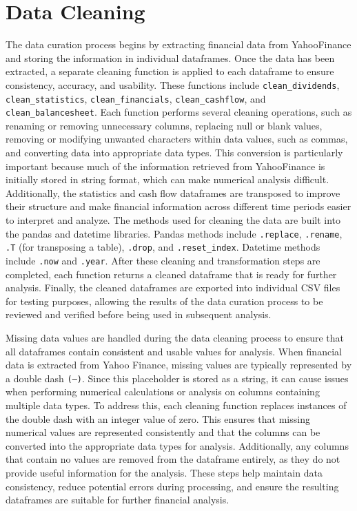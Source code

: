 \documentclass[runningheads]{llncs}
\begin{document}
\section{Data Cleaning}

The data curation process begins by extracting financial data from YahooFinance and storing the information in individual dataframes. Once the data has been extracted, a separate cleaning function is applied to each dataframe to ensure consistency, accuracy, and usability. These functions include \texttt{clean\_}\allowbreak\texttt{dividends}, \texttt{clean\_}\allowbreak\texttt{statistics}, \texttt{clean\_}\allowbreak\texttt{financials}, \texttt{clean\_}\allowbreak\texttt{cashflow}, and \texttt{clean\_}\allowbreak\texttt{balance}\allowbreak\texttt{sheet}. Each function performs several cleaning operations, such as renaming or removing unnecessary columns, replacing null or blank values, removing or modifying unwanted characters within data values, such as commas, and converting data into appropriate data types. This conversion is particularly important because much of the information retrieved from YahooFinance is initially stored in string format, which can make numerical analysis difficult. Additionally, the statistics and cash flow dataframes are transposed to improve their structure and make financial information across different time periods easier to interpret and analyze. The methods used for cleaning the data are built into the pandas and datetime libraries. Pandas methods include \texttt{.replace}, \texttt{.rename}, \texttt{.T} (for transposing a table), \texttt{.drop}, and \texttt{.reset\_index}. Datetime methods include \texttt{.now} and \texttt{.year}. After these cleaning and transformation steps are completed, each function returns a cleaned dataframe that is ready for further analysis. Finally, the cleaned dataframes are exported into individual CSV files for testing purposes, allowing the results of the data curation process to be reviewed and verified before being used in subsequent analysis.

Missing data values are handled during the data cleaning process to ensure that all dataframes contain consistent and usable values for analysis. When financial data is extracted from Yahoo Finance, missing values are typically represented by a double dash \texttt{(--)}. Since this placeholder is stored as a string, it can cause issues when performing numerical calculations or analysis on columns containing multiple data types. To address this, each cleaning function replaces instances of the double dash with an integer value of zero. This ensures that missing numerical values are represented consistently and that the columns can be converted into the appropriate data types for analysis. Additionally, any columns that contain no values are removed from the dataframe entirely, as they do not provide useful information for the analysis. These steps help maintain data consistency, reduce potential errors during processing, and ensure the resulting dataframes are suitable for further financial analysis.
\end{document}
